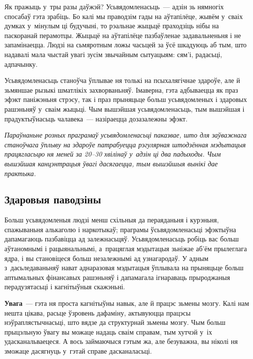 Як пражыць у~тры разы даўжэй? Усьвядомленасьць~--- адзін зь нямногіх спосабаў гэта зрабіць. Бо калі мы праводзім гады на аўтапілёце, жывём у~сваіх думках у~мінулым ці будучыні, то рэальнае жыцьцё праходзіць нібы на паскоранай перамотцы. Жыцьцё на аўтапілёце пазбаўленае задавальненьня і не запамінаецца. Людзі на сьмяротным ложы часьцей за ўсё шкадуюць аб тым, што надавалі мала чыстай увагі зусім звычайным сытуацыям: сям'і, радасьці, адпачынку.


Усьвядомленасьць станоўча ўплывае ня толькі на псыхалягічнае здароўе, але й зьмяншае рызыкі шматлікіх захворваньняў. Імаверна, гэта адбываецца як праз эфэкт паніжэньня стрэсу, так і праз прыняцьце больш усьвядомленых і здаровых рашэньняў у~сваім жыцьці. Чым вышэйшая усьвядомленасьць, тым вышэйшая і прадуктыўнасьць чалавека~--- назіраецца дозазалежны эфэкт.

\emph{Параўнаньне розных праграмаў усьвядомленасьці паказвае, што для заўважнага станоўчага ўплыву на здароўе патрабуецца рэгулярная штодзённая мэдытацыя працягласьцю ня меней за 20--30 хвілінаў у~адзін ці два падыходы. Чым вышэйшая канцэнтрацыя ўвагі дасягаецца, тым вышэйшыя вынікі дае практыка.}

\subsection*{Здаровыя паводзіны}

Больш усьвядомленыя людзі менш схільныя да пераяданьня і курэньня, спажываньня алькаголю і наркотыкаў; праграмы ўсьвядомленасьці эфэктыўна дапамагаюць пазбавіцца ад залежнасьцяў. Усьвядомленасьць робіць вас больш аўтаномнымі і рацыянальнымі, а~працяглая мэдытацыя зьніжае аб'ём прылеглага ядра, і вы становіцеся больш незалежнымі ад узнагародаў. У адным з~дасьледаваньняў нават аднаразовая мэдытацыя ўплывала на прыняцьце больш аптымальных фінансавых рашэньняў і дапамагала ігнараваць прыроджаныя перадузятасьці і кагнітыўныя скажэньні.

\textbf{Увага}~--- гэта ня проста кагнітыўны навык, але й працэс зьмены мозгу. Калі нам нешта цікава, расьце ўзровень дафаміну, актывуюцца працэсы нэўраплястычнасьці, што вядзе да структурнай зьмены мозгу. Чым больш прыцэльную ўвагу вы можаце надаць сваім справам, тым хутчэй у~іх удасканальваецеся. А вось займаючыся гэтым жа, але безуважна, вы ніколі ня зможаце дасягнуць у~гэтай справе дасканаласьці.

